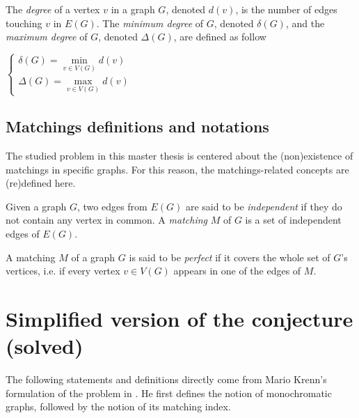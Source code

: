 \begin{definition}
    \label{def:degree}
    The \textit{degree} of a vertex $v$ in a graph $G$, denoted $d(v)$, is the number of edges touching $v$ in $E(G)$. The \textit{minimum degree} of $G$, denoted $\delta(G)$, and the \textit{maximum degree} of $G$, denoted $\Delta(G)$, are defined as follow
    \begin{center}
        $\left\{
        \begin{array}{l}
            \delta(G) = \min\limits_{v \in V(G)} d(v)\\
            \Delta(G) = \max\limits_{v \in V(G)} d(v)
        \end{array}
        \right.$
    \end{center}
\end{definition}


\subsection{Matchings definitions and notations}

The studied problem in this master thesis is centered about the (non)existence of matchings in specific graphs. For this reason, the matchings-related concepts are (re)defined here. \cite{graphtheory}

\begin{definition}[Matching]
    \label{def:matching}
    Given a graph $G$, two edges from $E(G)$ are said to be \textit{independent} if they do not contain any vertex in common. A \textit{matching} $M$ of $G$ is a set of independent edges of $E(G)$. 
\end{definition}

\begin{definition}
    \label{def:perfect_matching}
    A matching $M$ of a graph $G$ is said to be \textit{perfect} if it covers the whole set of $G$'s vertices, i.e. if every vertex $v \in V(G)$ appears in one of the edges of $M$.
\end{definition}



\section{Simplified version of the conjecture (solved)}

The following statements and definitions directly come from Mario Krenn's formulation of the problem in \cite{wordpress}. He first defines the notion of monochromatic graphs, followed by the notion of its matching index.

